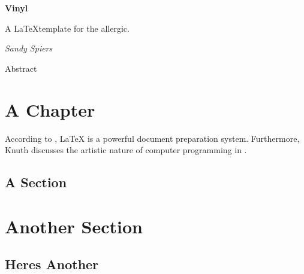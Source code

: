 \documentclass[book]{vinyl}
\begin{document}
\frontmatter

\begin{titlepage}
	\centering
	\vspace*{12em}

	{\bfseries\Huge Vinyl}

	\vspace{4em}

	{\large A \LaTeX template for the allergic.}

	\vspace{4em}

	{\itshape\large Sandy Spiers}

	\vfill
\end{titlepage}

\begin{prepage}{Abstract}
	\lipsum[1]
\end{prepage}

\tableofcontents

\mainmatter

\chapter{A Chapter}

According to \cite{lamport1994latex}, LaTeX is a powerful document preparation system.
Furthermore, Knuth discusses the artistic nature of computer programming in \cite{knuth1974computer}.

\lipsum[2]

\section{A Section}

\lipsum[4-16]

\chapter{Another Section}

\lipsum[17-20]

\section{Heres Another}

\lipsum[21-23]

\backmatter

\printbibliography
\end{document}
